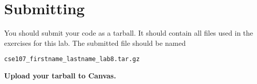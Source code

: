 \documentclass[11pt]{cselabheader}
\begin{document}
\pagebreak
\section{Submitting}

You should submit your code as a tarball. It should contain all files
used in the exercises for this lab. The submitted file should be named
\begin{center}
  \texttt{cse107\_firstname\_lastname\_lab8.tar.gz}
\end{center}

\begin{center}
  \textbf{Upload your tarball to Canvas.}
\end{center}

\listoftheorems
\end{document}
